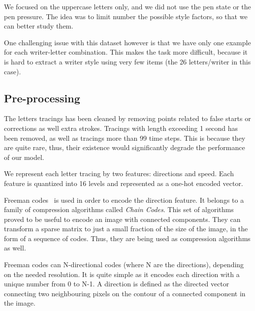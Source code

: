 \documentclass[conference]{IEEEtran}
\begin{document}
\par We focused on the uppercase letters only, and we did not use the pen state or the pen pressure. The idea was to limit number the possible style factors, so that we can better study them.

\par One challenging issue with this dataset however is that we have only one example for each writer-letter combination. This makes the task more difficult, because it is hard to extract a writer style using very few items (the 26 letters/writer in this case).

\subsection{Pre-processing} \label{sec:preprocessing}


\par The letters tracings has been cleaned by removing points related to false starts or corrections as well extra strokes. Tracings with length exceeding 1 second has been removed, as well as tracings more than 99 time steps. This is because they are quite rare, thus, their existence would significantly degrade the performance of our model.

\par We represent each letter tracing by two features: directions and speed. Each feature is quantized into 16 levels and represented as a one-hot encoded vector.

\par Freeman codes~\cite{freeman1961encoding} is used in order to encode the direction feature. It belongs to a family of compression algorithms called \textit{Chain Codes}. This set of algorithms proved to be useful to encode an image with connected components. They can transform a sparse matrix to just a small fraction of the size of the image, in the form of a sequence of codes. Thus, they are being used as compression algorithms as well.

\par Freeman codes can N-directional codes (where N are the directions), depending on the needed resolution. It is quite simple as it encodes each direction with a unique number from 0 to N-1. A direction is defined as the directed vector connecting two neighbouring pixels on the contour of a connected component in the image.
\end{document}
